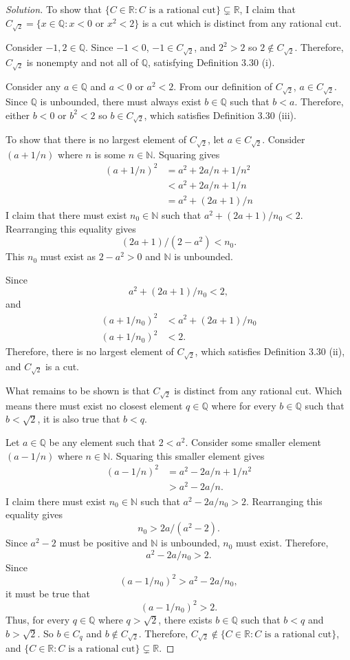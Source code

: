 \documentclass{amsart}
\newcommand{\N}{\mathbb N}
\newcommand{\Q}{\mathbb Q}
\newcommand{\R}{\mathbb R}
\newcommand{\1}{\mathds{1}}
\def \R {{\mathbb {R}}}
\def \N {{\mathbb {N}}}
\numberwithin{equation}{section}
\numberwithin{theorem}{section}
\begin{document}
\begin{proof}[Solution]
	
	To show that $\{C\in\R: C \text{ is a rational cut}\}\subsetneq \R$, I claim that $C_{\sqrt{2}} = \{x\in\Q: x<0 \text{ or } x^2<2\}$ is a cut which is distinct from any rational cut.
	
	Consider $-1,2\in\Q$. Since $-1<0$, $-1\in C_{\sqrt{2}}$, and $2^2 > 2$ so $2\notin C_{\sqrt{2}}$. Therefore, $C_{\sqrt{2}}$ is nonempty and not all of $\Q$, satisfying Definition 3.30 (i).
	
	Consider any $a\in\Q$ and $a<0$ or $a^2<2$. From our definition of $C_{\sqrt{2}}$, $a\in C_{\sqrt{2}}$. Since $\Q$ is unbounded, there must always exist $b\in\Q$ such that $b<a$. Therefore, either $b<0$ or $b^2<2$ so $b\in C_{\sqrt{2}}$, which satisfies Definition 3.30 (iii).
	
	To show that there is no largest element of $C_{\sqrt{2}}$, let $a\in C_{\sqrt{2}}$. Consider $(a+1/n)$ where $n$ is some $n\in\N$. Squaring gives
	\[\begin{split}
		(a+1/n)^2 &= a^2 + 2a/n + 1/n^2\\
				&<a^2 + 2a/n + 1/n\\
				&=a^2 + (2a+1)/n
	\end{split}\]
	I claim that there must exist $n_0\in\N$ such that $a^2 + (2a+1)/n_0 < 2$. Rearranging this equality gives $$(2a+1)/(2-a^2) < n_0.$$ This $n_0$ must exist as $2-a^2 > 0$ and $\N$ is unbounded. 
	
	Since $$a^2 + (2a+1)/n_0 < 2,$$ and 
	\[\begin{split}
		(a+1/n_0)^2 &< a^2 + (2a+1)/n_0\\
		(a+1/n_0)^2 &< 2.
	\end{split}\]
	Therefore, there is no largest element of $C_{\sqrt{2}}$, which satisfies Definition 3.30 (ii), and $C_{\sqrt{2}}$ is a cut. 
	
	What remains to be shown is that $C_{\sqrt{2}}$ is distinct from any rational cut. Which means there must exist no closest element $q\in\Q$ where for every $b\in\Q$ such that $b<\sqrt{2}$, it is also true that $b<q$. 
	
	Let $a\in\Q$ be any element such that $2<a^2$. Consider some smaller element $(a-1/n)$ where $n\in\N$. Squaring this smaller element gives
	\[\begin{split}
		(a-1/n)^2 &= a^2 - 2a/n + 1/n^2\\
		&>a^2 - 2a/n.
	\end{split}\]
	I claim there must exist $n_0\in\N$ such that $a^2 - 2a/n_0 > 2$. Rearranging this equality gives $$n_0 > 2a/(a^2-2).$$ Since $a^2-2$ must be positive and $\N$ is unbounded, $n_0$ must exist. Therefore, $$a^2 - 2a/n_0 > 2.$$ Since $$(a-1/n_0)^2 > a^2 - 2a/n_0,$$ it must be true that $$(a-1/n_0)^2 > 2.$$ Thus, for every $q\in\Q$ where $q>\sqrt{2}$, there exists $b\in\Q$ such that $b<q$ and $b>\sqrt{2}$. So $b\in C_q$ and $b\notin C_{\sqrt{2}}$. Therefore, $C_{\sqrt{2}} \notin \{C\in\R: C \text{ is a rational cut}\}$, and $\{C\in\R: C \text{ is a rational cut}\}\subsetneq \R$. 
	
\end{proof}
\end{document}
